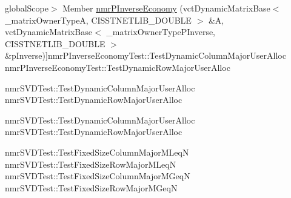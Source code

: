 \begin{DoxyRefList}
\hypertarget{test__test000020}{}%
global\+Scope$>$ Member \hyperlink{nmr_p_inverse_economy_8h_af93b2c1c9b8517e63053a1f6c18f8952}{nmr\+P\+Inverse\+Economy} (vct\+Dynamic\+Matrix\+Base$<$ \+\_\+matrix\+Owner\+Type\+A, C\+I\+S\+S\+T\+N\+E\+T\+L\+I\+B\+\_\+\+D\+O\+U\+B\+L\+E $>$ \&A, vct\+Dynamic\+Matrix\+Base$<$ \+\_\+matrix\+Owner\+Type\+P\+Inverse, C\+I\+S\+S\+T\+N\+E\+T\+L\+I\+B\+\_\+\+D\+O\+U\+B\+L\+E $>$ \&p\+Inverse)]nmr\+P\+Inverse\+Economy\+Test\+::\+Test\+Dynamic\+Column\+Major\+User\+Alloc nmr\+P\+Inverse\+Economy\+Test\+::\+Test\+Dynamic\+Row\+Major\+User\+Alloc  
\item[\label{test__test000022}%
\hypertarget{test__test000022}{}%
global\+Scope$>$ Member \hyperlink{nmr_s_v_d_8h_a43e3f84f416adc9ceb70daf99fd14b2b}{nmr\+S\+V\+D} (vct\+Dynamic\+Matrix\+Base$<$ \+\_\+matrix\+Owner\+Type\+A, C\+I\+S\+S\+T\+N\+E\+T\+L\+I\+B\+\_\+\+D\+O\+U\+B\+L\+E $>$ \&A, vct\+Dynamic\+Matrix\+Base$<$ \+\_\+matrix\+Owner\+Type\+U, C\+I\+S\+S\+T\+N\+E\+T\+L\+I\+B\+\_\+\+D\+O\+U\+B\+L\+E $>$ \&U, vct\+Dynamic\+Vector\+Base$<$ \+\_\+vector\+Owner\+Type\+S, C\+I\+S\+S\+T\+N\+E\+T\+L\+I\+B\+\_\+\+D\+O\+U\+B\+L\+E $>$ \&S, vct\+Dynamic\+Matrix\+Base$<$ \+\_\+matrix\+Owner\+Type\+Vt, C\+I\+S\+S\+T\+N\+E\+T\+L\+I\+B\+\_\+\+D\+O\+U\+B\+L\+E $>$ \&Vt, vct\+Dynamic\+Vector\+Base$<$ \+\_\+vector\+Owner\+Type\+Workspace, C\+I\+S\+S\+T\+N\+E\+T\+L\+I\+B\+\_\+\+D\+O\+U\+B\+L\+E $>$ \&Workspace)]nmr\+S\+V\+D\+Test\+::\+Test\+Dynamic\+Column\+Major\+User\+Alloc nmr\+S\+V\+D\+Test\+::\+Test\+Dynamic\+Row\+Major\+User\+Alloc  
\item[\label{test__test000023}%
\hypertarget{test__test000023}{}%
global\+Scope$>$ Member \hyperlink{nmr_s_v_d_8h_a671bda5b8998b6c851b3a497f2903560}{nmr\+S\+V\+D} (vct\+Dynamic\+Matrix\+Base$<$ \+\_\+matrix\+Owner\+Type\+A, C\+I\+S\+S\+T\+N\+E\+T\+L\+I\+B\+\_\+\+D\+O\+U\+B\+L\+E $>$ \&A, vct\+Dynamic\+Matrix\+Base$<$ \+\_\+matrix\+Owner\+Type\+U, C\+I\+S\+S\+T\+N\+E\+T\+L\+I\+B\+\_\+\+D\+O\+U\+B\+L\+E $>$ \&U, vct\+Dynamic\+Vector\+Base$<$ \+\_\+vector\+Owner\+Type\+S, C\+I\+S\+S\+T\+N\+E\+T\+L\+I\+B\+\_\+\+D\+O\+U\+B\+L\+E $>$ \&S, vct\+Dynamic\+Matrix\+Base$<$ \+\_\+matrix\+Owner\+Type\+Vt, C\+I\+S\+S\+T\+N\+E\+T\+L\+I\+B\+\_\+\+D\+O\+U\+B\+L\+E $>$ \&Vt)]nmr\+S\+V\+D\+Test\+::\+Test\+Dynamic\+Column\+Major\+User\+Alloc nmr\+S\+V\+D\+Test\+::\+Test\+Dynamic\+Row\+Major\+User\+Alloc 
\item[\label{test__test000026}%
\hypertarget{test__test000026}{}%
global\+Scope$>$ Member \hyperlink{nmr_s_v_d_8h_a52115d0e7a485c4494aa20f4f3f4ebe7}{nmr\+S\+V\+D} (vct\+Fixed\+Size\+Matrix$<$ C\+I\+S\+S\+T\+N\+E\+T\+L\+I\+B\+\_\+\+D\+O\+U\+B\+L\+E, \+\_\+rows, \+\_\+cols, \+\_\+storage\+Order $>$ \&A, nmr\+S\+V\+D\+Fixed\+Size\+Data$<$ \+\_\+rows, \+\_\+cols, \+\_\+storage\+Order $>$ \&data)]nmr\+S\+V\+D\+Test\+::\+Test\+Fixed\+Size\+Column\+Major\+M\+Leq\+N nmr\+S\+V\+D\+Test\+::\+Test\+Fixed\+Size\+Row\+Major\+M\+Leq\+N nmr\+S\+V\+D\+Test\+::\+Test\+Fixed\+Size\+Column\+Major\+M\+Geq\+N nmr\+S\+V\+D\+Test\+::\+Test\+Fixed\+Size\+Row\+Major\+M\+Geq\+N  

\end{DoxyRefList}
